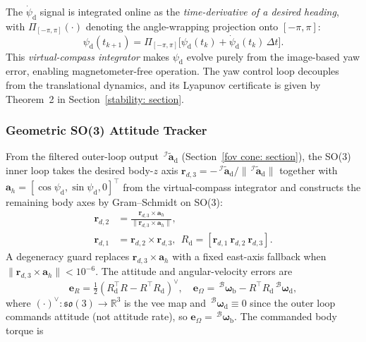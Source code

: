 The $\dot{\psi}_\text{d}$ signal is integrated online as the \emph{time-derivative of a desired heading}, with $\Pi_{[-\pi,\pi]}(\cdot)$ denoting the angle-wrapping projection onto $[-\pi,\pi]$:
\begin{equation} \label{psi d integrator: equation}
    \psi_\text{d}(t_{k+1}) = \Pi_{[-\pi,\pi]}\!\big[\psi_\text{d}(t_k) + \dot{\psi}_\text{d}(t_k)\,\Delta t\big].
\end{equation}
This \emph{virtual-compass integrator} makes $\psi_\text{d}$ evolve purely from the image-based yaw error, enabling magnetometer-free operation. The yaw control loop decouples from the translational dynamics, and its Lyapunov certificate is given by Theorem~2 in Section~\ref{stability: section}.

\subsubsection{Geometric SO(3) Attitude Tracker} \label{so3 inner loop: section}
From the filtered outer-loop output $\,^\mathcal{I}\tilde{\boldsymbol{a}}_\text{d}$ (Section~\ref{fov cone: section}), the SO(3) inner loop takes the desired body-$z$ axis $\boldsymbol{r}_{d,3}=-\,^\mathcal{I}\tilde{\boldsymbol{a}}_\text{d}/\|\,^\mathcal{I}\tilde{\boldsymbol{a}}_\text{d}\|$ together with $\boldsymbol{a}_h=[\cos\psi_\text{d},\sin\psi_\text{d},0]^\top$ from the virtual-compass integrator and constructs the remaining body axes by Gram--Schmidt on SO(3):
\begin{align} \label{R_d construction: equation}
    \boldsymbol{r}_{d,2} &= \frac{\boldsymbol{r}_{d,3}\times\boldsymbol{a}_h}{\|\boldsymbol{r}_{d,3}\times\boldsymbol{a}_h\|}, \nonumber\\
    \boldsymbol{r}_{d,1} &= \boldsymbol{r}_{d,2}\times\boldsymbol{r}_{d,3},\ \ R_\text{d}=[\boldsymbol{r}_{d,1}\ \boldsymbol{r}_{d,2}\ \boldsymbol{r}_{d,3}].
\end{align}
A degeneracy guard replaces $\boldsymbol{r}_{d,3}\times\boldsymbol{a}_h$ with a fixed east-axis fallback when $\|\boldsymbol{r}_{d,3}\times\boldsymbol{a}_h\|<10^{-6}$. The attitude and angular-velocity errors are
\begin{equation} \label{so3 errors: equation}
    \boldsymbol{e}_R = \tfrac12(R_\text{d}^\top R - R^\top R_\text{d})^\vee,\quad \boldsymbol{e}_\Omega = \,^\mathcal{B} \boldsymbol{\omega}_{\text{b}} - R^\top R_\text{d}\,^\mathcal{B}\boldsymbol{\omega}_\text{d},
\end{equation}
where $(\cdot)^\vee:\mathfrak{so}(3)\to\mathbb{R}^3$ is the vee map and $\,^\mathcal{B}\boldsymbol{\omega}_\text{d}\equiv 0$ since the outer loop commands attitude (not attitude rate), so $\boldsymbol{e}_\Omega=\,^\mathcal{B} \boldsymbol{\omega}_{\text{b}}$. The commanded body torque is
